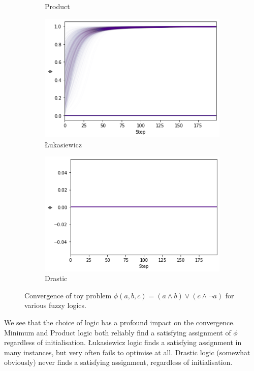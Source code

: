 \begin{figure}[h]
\begin{subfigure}[b]{0.45\textwidth}
        \caption{Product}
        \label{fig:toyprod}
    \end{subfigure}
    \begin{subfigure}[b]{0.45\textwidth}
        \centering
        \includegraphics[width=\textwidth]{imgs/toyconv_luk.png}
        \caption{Łukasiewicz}
        \label{fig:toyluk}
    \end{subfigure}
    \begin{subfigure}[b]{0.45\textwidth}
        \centering
        \includegraphics[width=\textwidth]{imgs/toyconv_dra.png}
        \caption{Drastic}
        \label{fig:toydra}
    \end{subfigure}
       \caption{Convergence of toy problem $\phi(a,b,c) = (a \land b) \lor (c \land \lnot a)$ for various fuzzy logics.}
       \label{fig:toyconv}
\end{figure}

We see that the choice of logic has a profound impact on the convergence. Minimum and Product logic both reliably find a satisfying assignment of $\phi$ regardless of initialisation. Łukasiewicz logic finds a satisfying assignment in many instances, but very often fails to optimise at all. Drastic logic (somewhat obviously) never finds a satisfying assignment, regardless of initialisation.

